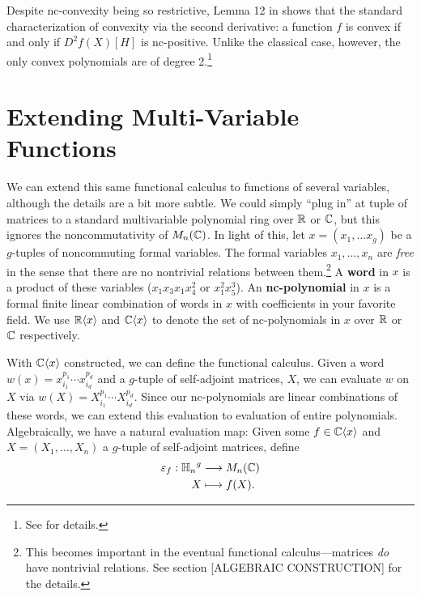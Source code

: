 Despite nc-convexity being so restrictive, Lemma 12 in \cite{heltonFree2013}
shows that the standard characterization of convexity via the second
derivative: a function \(f\) is convex if and only if \(D^{2}f(X)[H]\) is
nc-positive. Unlike the classical case, however, the only convex polynomials are
of degree 2.\footnote{See \cite{heltonFree2013} for details.}

\section{Extending Multi-Variable Functions}%
\label{sec:ExtMuliVarFun}

We can extend this same functional calculus to functions of several variables,
although the details are a bit more subtle. We could simply ``plug in'' at tuple
of matrices to a standard multivariable polynomial ring over \(\mathbb{R} \) or
\(\mathbb{C} \), but this ignores the noncommutativity of \(M_n(\mathbb{C})\). In light of this,
let \(x = (x_1 , \dots x_g)\) be a
\(g\)-tuples of noncommuting formal variables. The formal variables
\(x_1, \dots , x_n\) are \emph{free} in the sense that there are no nontrivial
relations between them.\footnote{This becomes important in the eventual
  functional calculus---matrices \emph{do} have nontrivial relations. See
  section [ALGEBRAIC CONSTRUCTION] for the details.}
A \textbf{word} in \(x\) is a product of these
variables (\eg \(x_1x_3x_1x_4^2\) or \(x_1^2x_5^3\)). An \textbf{nc-polynomial}
in \(x\) is a formal finite linear combination of words in \(x\) with
coefficients in your favorite field. We use \(\mathbb{R} \langle x \rangle\) and
\(\mathbb{C} \langle x \rangle\) to denote the set of nc-polynomials in \(x\) over
\(\mathbb{R} \) or \(\mathbb{C} \) respectively.

With \(\mathbb{C} \langle x \rangle \) constructed, we can define the functional
calculus. Given a word \(w(x) = x_{i_1}^{p_1}\cdots x_{i_d}^{p_d}\) and a
\(g\)-tuple of self-adjoint matrices, \(X\), we can evaluate \(w\) on \(X\) via
\(w(X) = X_{i_1}^{p_1}\cdots X_{i_d}^{p_d}\). Since our nc-polynomials are
linear combinations of these words, we can extend this evaluation to evaluation
of entire polynomials. Algebraically, we have a natural evaluation map:
Given some \(f \in \mathbb{C} \langle x \rangle \) and
\(X = \left( X_1, \dots ,X_n \right) \) a
\(g\)-tuple of self-adjoint matrices, define
\begin{align*}
  \varepsilon_f: {\mathbb{H}_n}^g &\longrightarrow M_n(\mathbb{C}) \\
             X &\longmapsto f(X)
.\end{align*}

